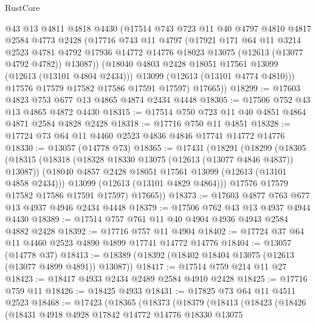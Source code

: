 \begin{lexlean}{RustCore}
\begin{coremodule}
          @43
          @13
          @4811
          @4818
          @4430
          (@17514
            @743
            @723
            @11
            @40
            @4797
            @4810
            @4817
            @2584
            @4773
            @2428
            (@17716
              @743
              @11
              @4797
              (@17921
                @171
                @64
                @11
                @3214
                @2523
                @4781
                @4792
                @17936
                @14772
                @14776
                @18023
                @13075
                (@12613 (@13077 @4792 @4782))
                @13087))
            (@18040 @4803 @2428 @18051 @17561 @13099 (@12613 (@13101 @4804 @2434)))
            @13099
            (@12613 (@13101 @4774 @4810)))
          @17576
          @17579
          @17582
          @17586
          @17591
          @17597)
        @17665))
@18299 := @17603 @4823 @753 @677 @13 @4865 @4874 @2434 @4448
@18305 := @17506 @752 @43 @13 @4865 @4872 @4430
@18315 := @17514 @750 @723 @11 @40 @4851 @4864 @4871 @2584 @4828 @2428
@18318 := @17716 @750 @11 @4851
@18328 := @17724 @73 @64 @11 @4460 @2523 @4836 @4846 @17741 @14772 @14776
@18330 := @13057 (@14778 @73)
@18365 := @17431
    (@18291
      (@18299
        (@18305
          (@18315
            (@18318 (@18328 @18330 @13075 (@12613 (@13077 @4846 @4837)) @13087))
            (@18040 @4857 @2428 @18051 @17561 @13099 (@12613 (@13101 @4858 @2434)))
            @13099
            (@12613 (@13101 @4829 @4864)))
          @17576
          @17579
          @17582
          @17586
          @17591
          @17597)
        @17665))
@18373 := @17603 @4877 @763 @677 @13 @4937 @4946 @2434 @4448
@18379 := @17506 @762 @43 @13 @4937 @4944 @4430
@18389 := @17514 @757 @761 @11 @40 @4904 @4936 @4943 @2584 @4882 @2428
@18392 := @17716 @757 @11 @4904
@18402 := @17724 @37 @64 @11 @4460 @2523 @4890 @4899 @17741 @14772 @14776
@18404 := @13057 (@14778 @37)
@18413 := @18389 (@18392 (@18402 @18404 @13075 (@12613 (@13077 @4899 @4891)) @13087))
@18417 := @17514 @759 @214 @11 @27
@18423 := @18417 @4933 @2434 @2489 @2584 @4910 @2428
@18425 := @17716 @759 @11
@18426 := @18425 @4933
@18431 := @17825 @73 @64 @11 @4511 @2523
@18468 := @17423
    (@18365
      (@18373
        (@18379
          (@18413
            (@18423
              (@18426
                (@18431
                  @4918
                  @4928
                  @17842
                  @14772
                  @14776
                  @18330
                  @13075

\end{coremodule}
\end{lexlean}
